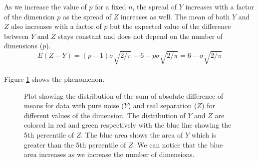 \documentclass[12]{article}
\begin{document}
As we increase the value of $p$ for a fixed $n$, the spread of $Y$ increases with a factor of the dimension $p$ as the spread of $Z$ increases as well. The mean of both $Y$ and $Z$ also increases with a factor of $p$ but the expected value of the difference between $Y$ and $Z$ stays constant and does not depend on the number of dimensions ($p$). 
$$E (Z - Y) = (p - 1) \sigma \sqrt{2/\pi} + 6 - p \sigma \sqrt{2/\pi} = 6 - \sigma \sqrt{2/\pi}$$ \\
 Figure \ref{fig:dimen} shows the phenomenon.  \\

%
\begin{figure}[hbtp]
   \centering
       \caption{Plot showing the distribution of the sum of absolute difference of means for data with pure noise ($Y$) and real separation ($Z$) for different values of the dimension. The distribution of $Y$ and $Z$ are colored in red and green respectively with the blue line showing the 5th percentile of $Z$. The blue area shows the area of $Y$ which is greater than the 5th percentile of $Z$. We can notice that the blue area increases as we increase the number of dimensions. }
     \label{fig:dimen}
\end{figure}
\end{document}
